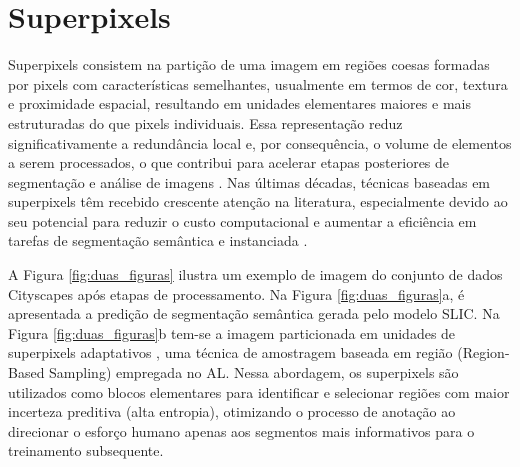 
\section{Superpixels}

Superpixels consistem na partição de uma imagem em regiões coesas formadas por pixels com características semelhantes, usualmente em termos de cor, textura e proximidade espacial, resultando em unidades elementares maiores e mais estruturadas do que pixels individuais. Essa representação reduz significativamente a redundância local e, por consequência, o volume de elementos a serem processados, o que contribui para acelerar etapas posteriores de segmentação e análise de imagens \cite{barcelos2024superpixel}. Nas últimas décadas, técnicas baseadas em superpixels têm recebido crescente atenção na literatura, especialmente devido ao seu potencial para reduzir o custo computacional e aumentar a eficiência em tarefas de segmentação semântica e instanciada \cite{vargas2014superpixel}.

A Figura \ref{fig:duas_figuras} ilustra um exemplo de imagem do conjunto de dados Cityscapes após etapas de processamento. Na Figura \ref{fig:duas_figuras}a, é apresentada a predição de segmentação semântica gerada pelo modelo \ac{SLIC}. Na Figura \ref{fig:duas_figuras}b tem-se a imagem particionada em unidades de superpixels adaptativos \cite{kim2023adaptive}, uma técnica de amostragem baseada em região (Region-Based Sampling) empregada no \ac{AL}. Nessa abordagem, os superpixels são utilizados como blocos elementares para identificar e selecionar regiões com maior incerteza preditiva (alta entropia), otimizando o processo de anotação ao direcionar o esforço humano apenas aos segmentos mais informativos para o treinamento subsequente. %



